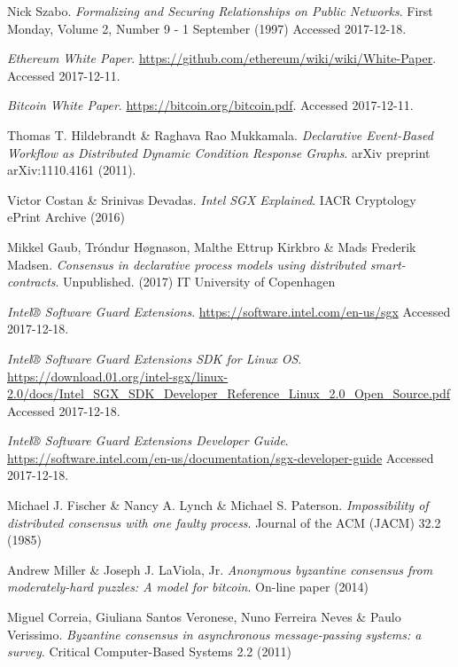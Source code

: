 \documentclass[12pt]{article}
\begin{document}
	\begin{thebibliography}{9}

		Nick Szabo.
		\textit{Formalizing and Securing Relationships on Public Networks}.
		First Monday, Volume 2, Number 9 - 1 September (1997)
		Accessed 2017-12-18.

		\textit{Ethereum White Paper}.
		\url{https://github.com/ethereum/wiki/wiki/White-Paper}.
		Accessed 2017-12-11.

		\textit{Bitcoin White Paper}.
		\url{https://bitcoin.org/bitcoin.pdf}.
		Accessed 2017-12-11.

		Thomas T. Hildebrandt \& Raghava Rao Mukkamala.
		\textit{Declarative Event-Based Workflow as Distributed Dynamic Condition Response Graphs}.
		arXiv preprint arXiv:1110.4161 (2011).

		Victor Costan \& Srinivas Devadas.
		\textit{Intel SGX Explained}.
		IACR Cryptology ePrint Archive (2016)

		Mikkel Gaub, Tróndur Høgnason, Malthe Ettrup Kirkbro \& Mads Frederik Madsen.
		\textit{Consensus in declarative process models using distributed smart-contracts}.
		Unpublished. (2017)
		IT University of Copenhagen  

		\textit{Intel® Software Guard Extensions}.
		\url{https://software.intel.com/en-us/sgx}
		Accessed 2017-12-18.

		\textit{Intel® Software Guard Extensions SDK for Linux OS}.
		\url{https://download.01.org/intel-sgx/linux-2.0/docs/Intel_SGX_SDK_Developer_Reference_Linux_2.0_Open_Source.pdf}
		Accessed 2017-12-18.

		\textit{Intel® Software Guard Extensions Developer Guide}.
		\url{https://software.intel.com/en-us/documentation/sgx-developer-guide}
		Accessed 2017-12-18.

		Michael J. Fischer \&  Nancy A. Lynch \& Michael S. Paterson.
		\textit{Impossibility of distributed consensus with one faulty process}.
		Journal of the ACM (JACM) 32.2 (1985)

		Andrew Miller \& Joseph J. LaViola, Jr.
  		\textit{Anonymous byzantine consensus from moderately-hard puzzles: A model for bitcoin}.
  		On-line paper (2014)

		Miguel Correia, Giuliana Santos Veronese, Nuno Ferreira Neves \& Paulo Verissimo.
		\textit{Byzantine consensus in asynchronous message-passing systems: a survey}.
		Critical Computer-Based Systems 2.2 (2011)


\end{thebibliography}
\end{document}
